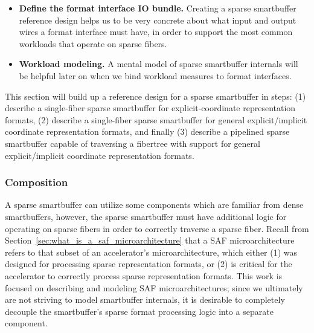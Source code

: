 \begin{itemize}
    \item \textbf{Define the format interface IO bundle.} Creating a sparse smartbuffer reference design helps us to be very concrete about what input and output wires a format interface must have, in order to support the most common workloads that operate on sparse fibers.
    \item \textbf{Workload modeling.} A mental model of sparse smartbuffer internals will be helpful later on when we bind workload measures to format interfaces.
\end{itemize}

This section will build up a reference design for a sparse smartbuffer in steps: (1) describe a single-fiber sparse smartbuffer for explicit-coordinate representation formats, (2) describe a single-fiber sparse smartbuffer for general explicit/implicit coordinate representation formats, and finally (3) describe a pipelined sparse smartbuffer capable of traversing a fibertree with support for general explicit/implicit coordinate representation formats.

\subsubsection{Composition}
\label{sec:composition}

A sparse smartbuffer can utilize some components which are familiar from dense smartbuffers\cite{buffet}\cite{sparseloop}, however, the sparse smartbuffer must have additional logic for operating on sparse fibers in order to correctly traverse a sparse fiber. Recall from Section~\ref{sec:what_is_a_saf_microarchitecture} that a SAF microarchitecture refers to that subset of an accelerator's microarchitecture, which either (1) was designed for processing sparse representation formats, or (2) is critical for the accelerator to correctly process sparse representation formats. This work is focused on describing and modeling SAF microarchitectures; since we ultimately are not striving to model smartbuffer internals, it is desirable to completely decouple the smartbuffer's sparse format processing logic into a separate component.

